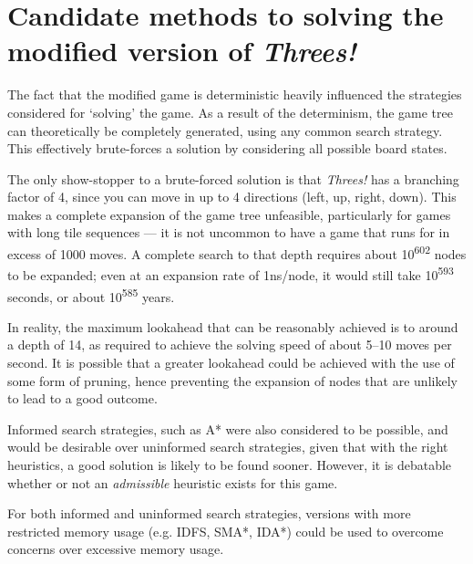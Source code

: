 \documentclass[a4paper, 11pt, titlepage]{report}
\newcommand{\ts}{\textsuperscript}
\newcommand{\threes}{\emph{Threes!}}
\begin{document}

\section{Candidate methods to solving the modified version of \threes{}}
The fact that the modified game is deterministic heavily influenced the strategies considered for `solving' the game. As a result of the determinism, the game tree can theoretically be completely generated, using any common search strategy. This effectively brute-forces a solution by considering all possible board states. 

The only show-stopper to a brute-forced solution is that \threes{} has a branching factor of 4, since you can move in up to 4 directions (left, up, right, down). This makes a complete expansion of the game tree unfeasible, particularly for games with long tile sequences --- it is not uncommon to have a game that runs for in excess of 1000 moves. A complete search to that depth requires about 10\ts{602} nodes to be expanded; even at an expansion rate of 1ns/node, it would still take 10\ts{593} seconds, or about 10\ts{585} years.  

In reality, the maximum lookahead that can be reasonably achieved is to around a depth of 14, as required to achieve the solving speed of about 5--10 moves per second. It is possible that a greater lookahead could be achieved with the use of some form of pruning, hence preventing the expansion of nodes that are unlikely to lead to a good outcome.

Informed search strategies, such as A* were also considered to be possible, and would be desirable over uninformed search strategies, given that with the right heuristics, a good solution is likely to be found sooner. However, it is debatable whether or not an \emph{admissible} heuristic exists for this game. 

For both informed and uninformed search strategies, versions with more restricted memory usage (e.g. IDFS, SMA*, IDA*) could be used to overcome concerns over excessive memory usage.
\end{document}
